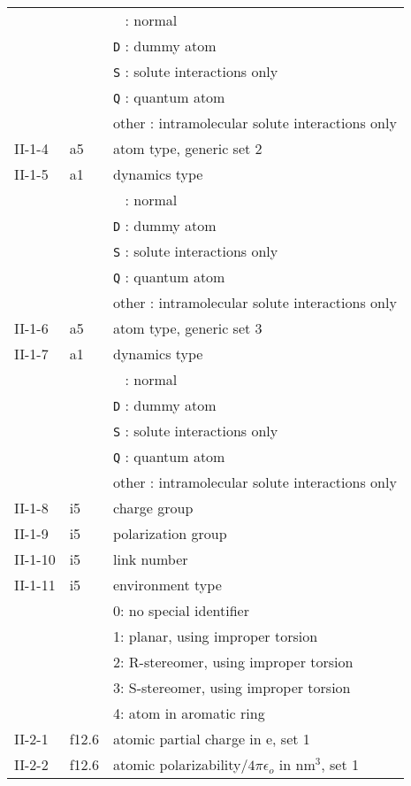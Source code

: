 \begin{center}
\begin{tabular*}{150mm}{p{12mm}p{12mm}l}
        &        & \verb+ + : normal\\
        &        & \verb+D+ : dummy atom\\
        &        & \verb+S+ : solute interactions only\\
        &        & \verb+Q+ : quantum atom\\
        &        & other : intramolecular solute interactions only\\
II-1-4  & a5     & atom type, generic set 2 \\
II-1-5  & a1     & dynamics type\\
        &        & \verb+ + : normal\\
        &        & \verb+D+ : dummy atom\\
        &        & \verb+S+ : solute interactions only\\
        &        & \verb+Q+ : quantum atom\\
        &        & other : intramolecular solute interactions only\\
II-1-6  & a5     & atom type, generic set 3 \\
II-1-7  & a1     & dynamics type\\
        &        & \verb+ + : normal\\
        &        & \verb+D+ : dummy atom\\
        &        & \verb+S+ : solute interactions only\\
        &        & \verb+Q+ : quantum atom\\
        &        & other : intramolecular solute interactions only\\
II-1-8  & i5     & charge group\\
II-1-9  & i5     & polarization group\\
II-1-10 & i5     & link number\\
II-1-11 & i5     & environment type\\
        &        & 0: no special identifier\\
        &        & 1: planar, using improper torsion\\
        &        & 2: R-stereomer, using improper torsion\\
        &        & 3: S-stereomer, using improper torsion\\
        &        & 4: atom in aromatic ring\\
II-2-1  & f12.6  & atomic partial charge in e, set 1\\
II-2-2  & f12.6  & atomic polarizability/$4\pi\epsilon_o$ in nm$^3$, set 1\\

\end{tabular*}
\end{center}
